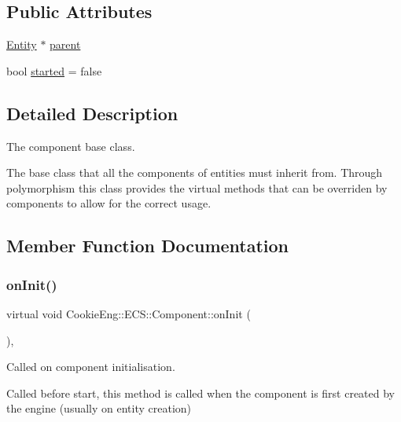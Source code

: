 \subsection*{Public Attributes}
\begin{DoxyCompactItemize}
\item 
\hyperlink{class_cookie_eng_1_1_e_c_s_1_1_entity}{Entity} $\ast$ \hyperlink{class_cookie_eng_1_1_e_c_s_1_1_component_a8a0c5a4ee3a87809d3e6d0bdaed3ebbe}{parent}
\item 
bool \hyperlink{class_cookie_eng_1_1_e_c_s_1_1_component_aa7129172e0881ed80dbc6256570ad998}{started} = false
\end{DoxyCompactItemize}


\subsection{Detailed Description}
The component base class. 

The base class that all the components of entities must inherit from. Through polymorphism this class provides the virtual methods that can be overriden by components to allow for the correct usage. 

\subsection{Member Function Documentation}
\mbox{\label{class_cookie_eng_1_1_e_c_s_1_1_component_a4b02b630558005a9c4723cf15b8b03d6}} 
\subsubsection{\texorpdfstring{on\+Init()}{onInit()}}
{\footnotesize\ttfamily virtual void Cookie\+Eng\+::\+E\+C\+S\+::\+Component\+::on\+Init (\begin{DoxyParamCaption}{ }\end{DoxyParamCaption})\hspace{0.3cm}{\ttfamily [inline]}, {\ttfamily [virtual]}}



Called on component initialisation. 

Called before start, this method is called when the component is first created by the engine (usually on entity creation) 

